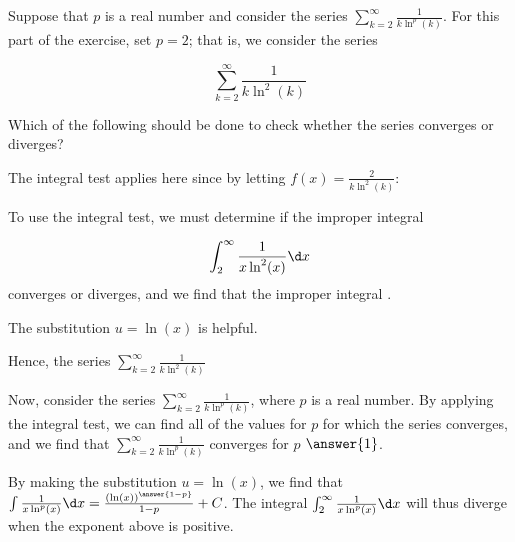 \documentclass{ximera}
\author{Jim Talamo}
\begin{document}
\begin{exercise}
Suppose that $p$ is a real number and consider the series $\sum_{k=2}^{\infty} \frac{1}{k\ln^p(k)}$.  For this part of the exercise, set $p=2$; that is, we consider the series 

\[
\sum_{k=2}^{\infty} \frac{1}{k\ln^2(k)}
\]

Which of the following should be done to check whether the series converges or diverges?
\begin{multipleChoice}
\end{multipleChoice}

\begin{exercise}
The integral test applies here since by letting $f(x) = \frac{2}{k\ln^2(k)}$:
\begin{selectAll}
\end{selectAll}

To use the integral test, we must determine if the improper integral

\[
\int_2^{\infty} \frac{1}{x\ln^2(x)} \d x
\]
converges or diverges, and we find that the improper integral .

\begin{hint}
The substitution $u=\ln(x)$ is helpful.
\end{hint}
\begin{exercise}

Hence, the series  $\sum_{k=2}^{\infty} \frac{1}{k\ln^2(k)}$
\begin{multipleChoice}
\end{multipleChoice}

\begin{exercise}
Now, consider the series $\sum_{k=2}^{\infty} \frac{1}{k\ln^p(k)}$, where $p$ is a real number.  By applying the integral test, we can find all of the values for $p$ for which the series converges, and we find that $\sum_{k=2}^{\infty} \frac{1}{k\ln^p(k)}$ converges for $p$ \wordChoice{\choice{$<$}\choice{$\leq$}\choice[correct]{$>$}\choice{$\geq$}} $\answer{1}$.

\begin{hint}
By making the substitution $u= \ln(x)$, we find that $\int \frac{1}{x\ln^p(x)} \d x = \frac{(\ln(x))^{\answer{1-p}}}{1-p} +C$.  The integral  $\int_2^{\infty} \frac{1}{x\ln^p(x)} \d x $ will thus diverge when the exponent above is positive.
\end{hint}
\end{exercise}
\end{exercise}
\end{exercise}
\end{exercise}
\end{document}
